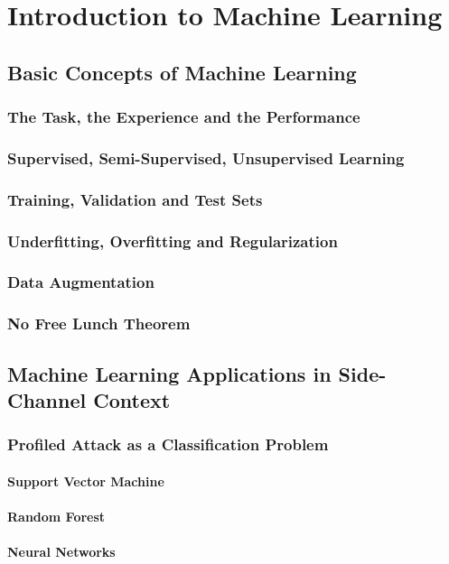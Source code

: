 
\chapter{Introduction to Machine Learning} %

\label{ChapterIntroML}


\section{Basic Concepts of Machine Learning}
\subsection{The Task, the Experience and the Performance}
\subsection{Supervised, Semi-Supervised, Unsupervised Learning}
\subsection{Training, Validation and Test Sets}
\subsection{Underfitting, Overfitting and Regularization}
\subsection{Data Augmentation}
\subsection{No Free Lunch Theorem}


\section{Machine Learning Applications in Side-Channel Context}
\subsection{Profiled Attack as a Classification Problem}
\subsubsection{Support Vector Machine}
\subsubsection{Random Forest}
\subsubsection{Neural Networks}

